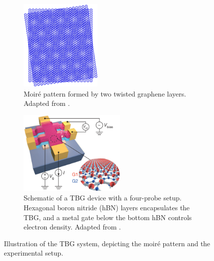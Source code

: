\begin{figure}[H]
\centering
\begin{subfigure}{.37\textwidth}
  \centering
  \includegraphics[height=12em]{fig/moire_pattern.png}
  \caption{Moiré pattern formed by two twisted graphene layers. Adapted from \cite{moire_pattern_figure2021}.}
  \label{fig:moire_pattern}
\end{subfigure} \hfill
\begin{subfigure}{.60\textwidth}
  \centering
  \includegraphics[height=11em]{fig/tbg_device2.png}
  \caption{Schematic of a TBG device with a four-probe setup. Hexagonal boron nitride (hBN) layers encapsulates the TBG, and a metal gate below the bottom hBN controls electron density. Adapted from \cite{cao2018}.}
  \label{fig:tbg_device2}
\end{subfigure}
\caption{Illustration of the TBG system, depicting the moiré pattern and the experimental setup.}
\label{fig:tbg_moire_device}
\end{figure}


